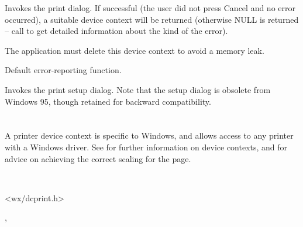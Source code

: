 \label{wxprinterprintdialog}


Invokes the print dialog. If successful (the user did not press Cancel
and no error occurred), a suitable device context will be returned
(otherwise NULL is returned -- call
 to get detailed
information about the kind of the error).

The application must delete this device context to avoid a memory leak.

\label{wxprinterreporterror}


Default error-reporting function.

\label{wxprintersetup}


Invokes the print setup dialog. Note that the setup dialog is obsolete from
Windows 95, though retained for backward compatibility.

\section{}\label{wxprinterdc}

A printer device context is specific to Windows, and allows access to
any printer with a Windows driver. See  for further information
on device contexts, and  for advice on
achieving the correct scaling for the page.


\\


<wx/dcprint.h>


, 




